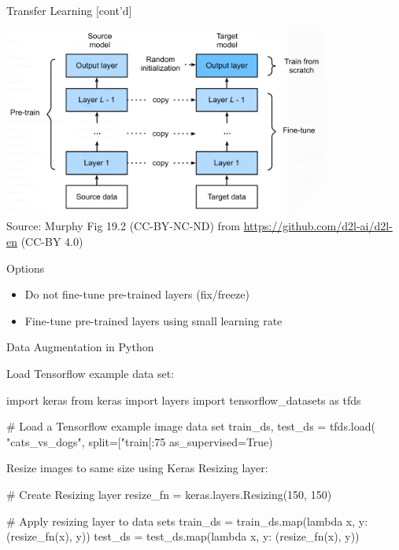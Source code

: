 \documentclass[ignorenonframetext,xcolor=x11names]{beamer}
\begin{document}
\begin{frame}{Transfer Learning \small [cont'd]}

\begin{center}
\includegraphics[width=0.8\textwidth]{murphy_19_02.png} \\
\scriptsize Source: Murphy Fig 19.2 (CC-BY-NC-ND) from \url{https://github.com/d2l-ai/d2l-en} (CC-BY 4.0) \normalsize
\end{center}

\begin{block}{Options}
\begin{itemize}
   \item Do not fine-tune pre-trained layers (fix/freeze)
   \item Fine-tune pre-trained layers using small learning rate
\end{itemize}
\end{block}   
\end{frame}

\begin{frame}[fragile]{Data Augmentation in Python}

Load Tensorflow example data set:
\begin{pythoncode}
import keras
from keras import layers
import tensorflow_datasets as tfds

# Load a Tensorflow example image data set
train_ds, test_ds = tfds.load(
    "cats_vs_dogs",
    split=["train[:75%
    as_supervised=True)
\end{pythoncode}

Resize images to same size using Keras Resizing layer:
\begin{pythoncode}
# Create Resizing layer
resize_fn = keras.layers.Resizing(150, 150)

# Apply resizing layer to data sets
train_ds = train_ds.map(lambda x, y: (resize_fn(x), y))
test_ds = test_ds.map(lambda x, y: (resize_fn(x), y))
\end{pythoncode}
\end{frame}
\end{document}
